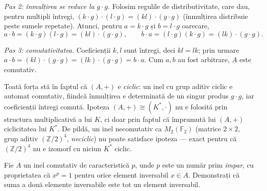 \begin{solutie}
\smallskip
\textit{Pas 2: înmulțirea se reduce la $g\cdot g$.} Folosim regulile
de distributivitate, care dau, pentru multipli întregi,
$(k\cdot g)\cdot(l\cdot g)=(kl)\cdot(g\cdot g)$ (înmulțirea distribuie
peste sumele repetate). Atunci, pentru $a=k\cdot g$ și $b=l\cdot g$
oarecare,
\[
  a\cdot b=(k\cdot g)(l\cdot g)=(kl)\cdot(g\cdot g),\qquad
  b\cdot a=(l\cdot g)(k\cdot g)=(lk)\cdot(g\cdot g).
\]

\smallskip
\textit{Pas 3: comutativitatea.} Coeficienții $k,l$ sunt întregi, deci
$kl=lk$; prin urmare $a\cdot b=(kl)\cdot(g\cdot g)=(lk)\cdot(g\cdot g)=b\cdot a$.
Cum $a,b$ au fost arbitrare, $A$ este comutativ.
\end{solutie}

\begin{obs}
Toată forța stă în faptul că $(A,+)$ e \emph{ciclic}: un
inel cu grup aditiv ciclic e automat comutativ, fiindcă înmulțirea
e determinată de un singur produs $g\cdot g$, iar coeficienții
întregi comută. Ipoteza $(A,+)\cong(K^{*},\cdot)$ nu e folosită
prin structura multiplicativă a lui $K$, ci doar prin faptul că
împrumută lui $(A,+)$ ciclicitatea lui $K^{*}$. De pildă, un inel
necomutativ ca $M_{2}(\mathbb{F}_{2})$ (matrice $2\times 2$, grup aditiv
$(\mathbb{Z}/2)^{4}$, \emph{neciclic}) nu poate satisface ipoteza --- exact
pentru că $(\mathbb{Z}/2)^{4}$ nu e izomorf cu niciun $K^{*}$ ciclic.
\end{obs}

\begin{problema}
Fie $A$ un inel comutativ de caracteristică $p$, unde $p$ este un
număr prim \emph{impar}, cu proprietatea că $x^{p}=1$ pentru orice
element inversabil $x\in A$. Demonstrați că suma a două elemente
inversabile este tot un element inversabil.
\end{problema}

